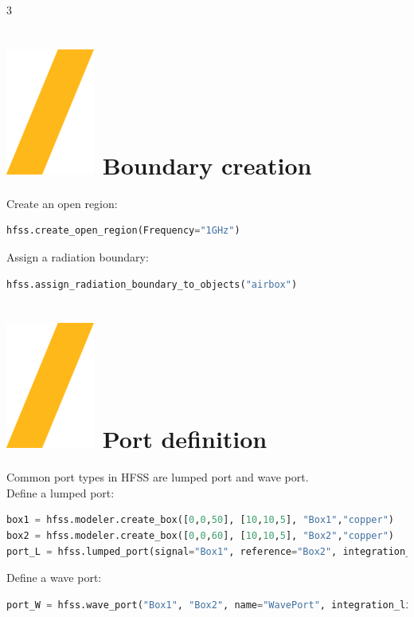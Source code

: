 \documentclass[9pt,landscape]{article}
\begin{document}
\begin{multicols}{3}
\section{\includegraphics[height=\fontcharht\font`\S]{slash.png} Boundary creation}
Create an open region:
\begin{lstlisting}[language=Python]
hfss.create_open_region(Frequency="1GHz")
\end{lstlisting}
Assign a radiation boundary:
\begin{lstlisting}[language=Python]
hfss.assign_radiation_boundary_to_objects("airbox")
\end{lstlisting}

\section{\includegraphics[height=\fontcharht\font`\S]{slash.png} Port definition}
Common port types in HFSS are lumped port and wave port.
\newline
\\
Define a lumped port:
\begin{lstlisting}[language=Python]
box1 = hfss.modeler.create_box([0,0,50], [10,10,5], "Box1","copper")
box2 = hfss.modeler.create_box([0,0,60], [10,10,5], "Box2","copper")
port_L = hfss.lumped_port(signal="Box1", reference="Box2", integration_line=hfss.AxisDir.XNeg, impedance=50, name="LumpedPort", renormalize=True, deembed=False)
\end{lstlisting}
Define a wave port:
\begin{lstlisting}[language=Python]
port_W = hfss.wave_port("Box1", "Box2", name="WavePort", integration_line=1)
\end{lstlisting}


\end{multicols}
\end{document}
